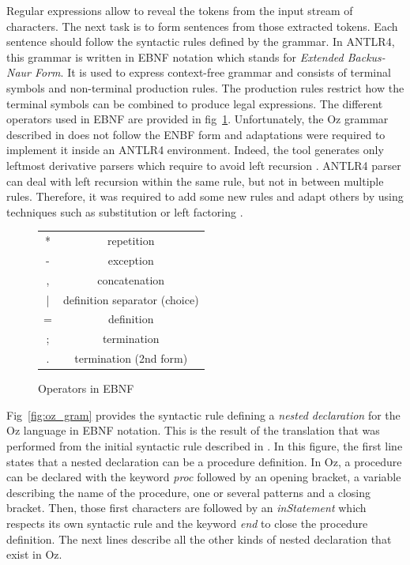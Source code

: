 \documentclass[11pt,a4paper,twoside,openright]{report}
\begin{document}
Regular expressions allow to reveal the tokens from the input stream of 
characters. The next task is to form sentences from 
those extracted tokens. Each sentence should follow the syntactic rules defined 
by the grammar. In \textsc{ANTLR4},  this grammar is written in \textsc{EBNF} 
notation which stands for \textit{Extended Backus-Naur Form}. It is used to 
express context-free grammar and consists of terminal symbols and non-terminal 
production rules. The production rules restrict how the terminal symbols can be 
combined to produce legal expressions. The different operators used in 
EBNF are provided in fig~\ref{fig:ebnf_ope}. Unfortunately, the Oz grammar 
described in \cite{vanroy_haridi_oz} does not follow the \textsc{ENBF} form 
and adaptations were required to implement it inside an \textsc{ANTLR4} 
environment. Indeed, the tool generates only leftmost derivative parsers which 
require to avoid left recursion \cite{antlr_ref}. ANTLR4 parser can deal with 
left recursion within the same rule, but not in between multiple rules. 
Therefore, it was required to add some new rules and adapt others by using 
techniques such as substitution or left factoring \cite{compiler_book}.\\

\begin{figure}[!ht]
 \centering
    \begin{tabular}{cc}
    * & repetition \\
    - & exception \\
    , & concatenation \\
    | & definition separator (choice) \\
    = & definition \\
    ; & termination \\
    . & termination (2nd form)
  \end{tabular}
  \caption{Operators in EBNF}
  \label{fig:ebnf_ope}
\end{figure}

Fig~\ref{fig:oz_gram} provides the syntactic rule defining a \textit{nested 
declaration} for the Oz language in EBNF notation. This is the result of the 
translation that was performed from the initial syntactic rule described in 
\cite{vanroy_haridi_oz}. In this figure, the first line states that a nested 
declaration can be a procedure definition. In Oz, a procedure can be declared 
with the keyword \textit{proc} followed by an opening bracket, a variable 
describing the name of the procedure, one or several patterns and a closing 
bracket. Then, those first characters are followed by an \textit{inStatement} 
which respects its own syntactic rule and the keyword \textit{end} to close 
the procedure definition. The next lines describe all the other kinds of 
nested declaration that exist in Oz.\\
\end{document}
